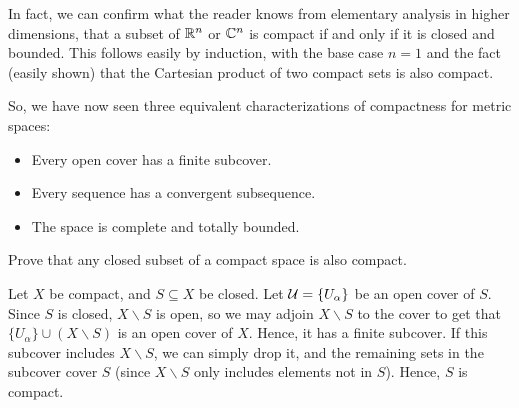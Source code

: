 In fact, we can confirm what the reader knows from elementary analysis in higher dimensions, that a subset of $\mathbb R^n$ or $\mathbb C^n$ is compact if and only if it is closed and bounded. This follows easily by induction, with the base case $n=1$ and the fact (easily shown) that the Cartesian product of two compact sets is also compact.

So, we have now seen three equivalent characterizations of compactness for metric spaces:
\begin{itemize}
	\item Every open cover has a finite subcover.
	\item Every sequence has a convergent subsequence.
	\item The space is complete and totally bounded.
\end{itemize}

\begin{exercise}
	Prove that any closed subset of a compact space is also compact.
	
	\begin{sol}
		Let $X$ be compact, and $S \subseteq X$ be closed. Let $\mathcal{U}=\{U_{\alpha}\}$ be an open cover of $S$. Since $S$ is closed, $X \backslash S$ is open, so we may adjoin $X \backslash S$ to the cover to get that $\{U_{\alpha}\} \cup (X \backslash S)$ is an open cover of $X$. Hence, it has a finite subcover. If this subcover includes $X \backslash S$, we can simply drop it, and the remaining sets in the subcover cover $S$ (since $X \backslash S$ only includes elements not in $S$). Hence, $S$ is compact.
	\end{sol}
\end{exercise}


